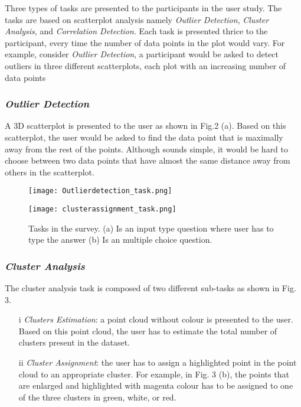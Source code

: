 \documentclass[journal]{vgtc}                %
\begin{document}
Three types of tasks are presented to the participants in the user study. The tasks are based on scatterplot analysis namely \textit{Outlier Detection}, \textit{Cluster Analysis}, and \textit{Correlation Detection}. Each task is presented thrice to the participant, every time the number of data points in the plot would vary. For example, consider \textit{Outlier Detection}, a participant would be asked to detect outliers in three different scatterplots, each plot with an increasing number of data points


\subsubsection{\textit{Outlier Detection}}
A 3D scatterplot is presented to the user as shown in Fig.2 (a). Based on this scatterplot, the user would be asked to find the data point that is maximally away from the rest of the points. Although sounds simple, it would be hard to choose between two data points that have almost the same distance away from others in the scatterplot. 

\begin{figure}[ht]
    \begin{minipage}[b]{0.45\linewidth}
        \centering
        \texttt{[image: Outlierdetection\_task.png]}
    \end{minipage}
    \hspace{0.5cm}
    \begin{minipage}[b]{0.45\linewidth}
        \centering
        \texttt{[image: clusterassignment\_task.png]}
    \end{minipage}
    \caption{Tasks in the survey. (a) Is an input type question where user has to type the answer (b) Is an multiple choice question.}
\end{figure}

\subsubsection{\textit{Cluster Analysis}}
The cluster analysis task is composed of two different sub-tasks as shown in Fig. 3.
\begin{enumerate}
    \item[i] \textit{Clusters Estimation}: a point cloud without colour is presented to the user. Based on this point cloud, the user has to estimate the total number of clusters present in the dataset. 
    \item[ii] \textit{Cluster Assignment}: the user has to assign a highlighted point in the point cloud to an appropriate cluster. For example, in Fig. 3 (b), the points that are enlarged and highlighted with magenta colour has to be assigned to one of the three clusters in green, white, or red. 
\end{enumerate}
\end{document}
